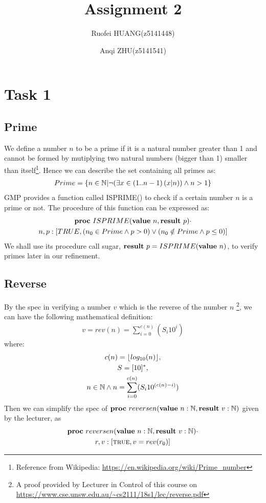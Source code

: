\documentclass[a4paper,12pt,fleqn]{scrartcl}
\title{Assignment 2}
\author{Ruofei HUANG(z5141448)\and
Anqi ZHU(z5141541)
}
\begin{document}
\maketitle
\section{Task 1}
\subsection{Prime }
We define a number $n$ to be a prime if it is a natural number greater than 1 and 
cannot be formed by mutiplying two natural numbers (bigger than 1) smaller than 
itself\footnote{
Reference from Wikipedia:
\url{https://en.wikipedia.org/wiki/Prime_number}}.
Hence we can describe the set containing all primes as:
\begin{gather*}
  Prime = \{ n\in \mathbb{N} | \neg (\exists x\in (1..n-1)\left(x|n\right)) \wedge n > 1 \}
\end{gather*} 
GMP provides a function called ISPRIME() to check if a certain number $n$ is a 
prime or not. The procedure of this function can be expressed as:
\begin{gather*}
  \text{\normalfont\bfseries proc} \ ISPRIME(\text{\normalfont\bfseries value} \ n, \text{\normalfont\bfseries result} \ p) \cdot \\
  n, p: [TRUE, (n_0 \in Prime \wedge p > 0) \vee (n_0 \notin Prime \wedge p \leq 0)]
\end{gather*}
We shall use its procedure call sugar, $\text{\normalfont\bfseries result} \ p = ISPRIME(\text{\normalfont\bfseries value} \ n)$, to 
verify primes later in our refinement.

\subsection{Reverse}
By the spec in verifying a number $v$ which is the reverse of the number $n$
\footnote{A proof provided by Lecturer in Control of this course on 
\url{https://www.cse.unsw.edu.au/~cs2111/18s1/lec/reverse.pdf} },
we can have the following mathematical definition:
\begin{gather*}
  v = rev(n) = \sum_{i= 0}^{c(n)}(S_i 10^i)
\end{gather*}
where:
\begin{gather*}
  c(n) = \lfloor log_{10}(n)\rfloor ,\\
  S = [10]^* ,\\
  n \in \mathbb{N} \wedge n = \sum_{i=0}^{c(n)}(S_i 10 ^{(c(n)-i)})
\end{gather*}
Then we can simplify the spec of 
$\text{\normalfont\bfseries proc} \ reversen(\text{\normalfont\bfseries value} \ n: \mathbb{N}, \text{\normalfont\bfseries result} \ v: \mathbb{N} )$ 
given by the lecturer, as 
\begin{gather*}
  \text{\normalfont\bfseries proc} \ reversen(\text{\normalfont\bfseries value} \ n: \mathbb{N}, \text{\normalfont\bfseries result} \ v: \mathbb{N} ) \cdot \\
  r, v:[\text{\textsc{true}}, v = rev(r_0)]
\end{gather*}
\end{document}
